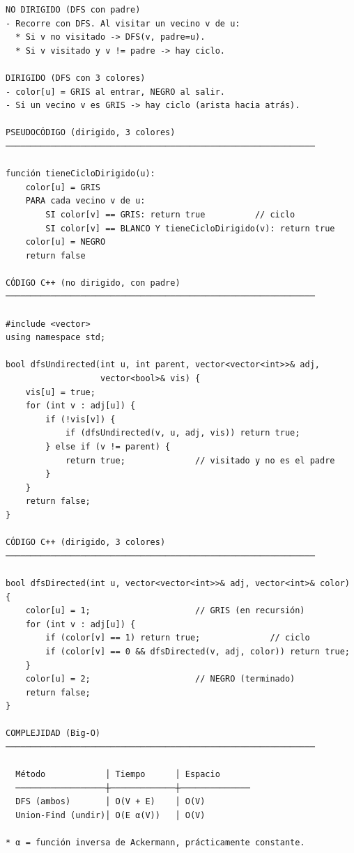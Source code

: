 \begin{lstlisting}
NO DIRIGIDO (DFS con padre)
- Recorre con DFS. Al visitar un vecino v de u:
  * Si v no visitado -> DFS(v, padre=u).
  * Si v visitado y v != padre -> hay ciclo.

DIRIGIDO (DFS con 3 colores)
- color[u] = GRIS al entrar, NEGRO al salir.
- Si un vecino v es GRIS -> hay ciclo (arista hacia atrás).

PSEUDOCÓDIGO (dirigido, 3 colores)
──────────────────────────────────────────────────────────────

función tieneCicloDirigido(u):
    color[u] = GRIS
    PARA cada vecino v de u:
        SI color[v] == GRIS: return true          // ciclo
        SI color[v] == BLANCO Y tieneCicloDirigido(v): return true
    color[u] = NEGRO
    return false

CÓDIGO C++ (no dirigido, con padre)
──────────────────────────────────────────────────────────────

#include <vector>
using namespace std;

bool dfsUndirected(int u, int parent, vector<vector<int>>& adj,
                   vector<bool>& vis) {
    vis[u] = true;
    for (int v : adj[u]) {
        if (!vis[v]) {
            if (dfsUndirected(v, u, adj, vis)) return true;
        } else if (v != parent) {
            return true;              // visitado y no es el padre
        }
    }
    return false;
}

CÓDIGO C++ (dirigido, 3 colores)
──────────────────────────────────────────────────────────────

bool dfsDirected(int u, vector<vector<int>>& adj, vector<int>& color) {
    color[u] = 1;                     // GRIS (en recursión)
    for (int v : adj[u]) {
        if (color[v] == 1) return true;              // ciclo
        if (color[v] == 0 && dfsDirected(v, adj, color)) return true;
    }
    color[u] = 2;                     // NEGRO (terminado)
    return false;
}

COMPLEJIDAD (Big-O)
──────────────────────────────────────────────────────────────

  Método            │ Tiempo      │ Espacio
  ──────────────────┼─────────────┼──────────────
  DFS (ambos)       │ O(V + E)    │ O(V)
  Union-Find (undir)│ O(E α(V))   │ O(V)

* α = función inversa de Ackermann, prácticamente constante.
\end{lstlisting}

